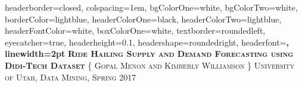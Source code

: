 \documentclass[landscape,a0paper,fontscale=0.285]{baposter} %
\begin{document}
\begin{poster}
{
headerborder=closed, %
colspacing=1em, %
bgColorOne=white, %
bgColorTwo=white, %
borderColor=lightblue, %
headerColorOne=black, %
headerColorTwo=lightblue, %
headerFontColor=white, %
boxColorOne=white, %
textborder=roundedleft, %
eyecatcher=true, %
headerheight=0.1\textheight, %
headershape=roundedright, %
headerfont=\Large\bf\textsc, %
linewidth=2pt %
}
%
{} %
{\bf\textsc{Ride Hailing Supply and Demand Forecasting using Didi-Tech Dataset}\vspace{0.5em}} %
{\textsc{\{ Gopal Menon and Kimberly Williamson \} \hspace{12pt} University of Utah, Data Mining, Spring 2017}} %


\end{poster}
\end{document}
